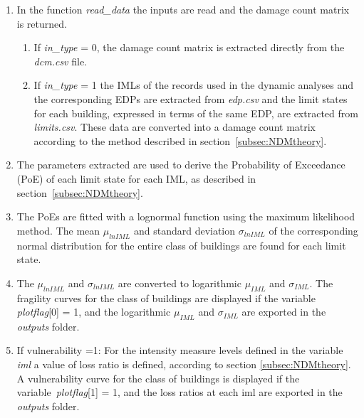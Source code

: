 \begin{enumerate}
\item In the function \textit{read\_data} the inputs are read and the damage count matrix is returned.
\begin{enumerate}
\item If \textit{in\_type} = 0, the damage count matrix is extracted directly from the \textit{dcm.csv} file.

\item If \textit{in\_type} = 1 the IMLs of the records used in the dynamic analyses and the corresponding EDPs are extracted from \textit{edp.csv} and the limit states for each building, expressed in terms of the same EDP, are extracted from \textit{limits.csv}.	 These data are converted into a damage count matrix according to the method described in section~\ref{subsec:NDMtheory}.
\end{enumerate}

\item The parameters extracted are used to derive the Probability of Exceedance (PoE) of each limit state for each IML, as described in section~\ref{subsec:NDMtheory}.

\item The PoEs are fitted with a lognormal function using the maximum likelihood method. The mean $\mu_{ln IML}$ and standard deviation $\sigma_{ln IML}$ of the corresponding normal distribution for the entire class of buildings are found for each limit state.

\item The $\mu_{ln IML}$ and $\sigma_{ln IML}$ are converted to logarithmic $\mu_{IML}$ and $\sigma_{IML}$. The fragility curves for the class of buildings are displayed if the variable \textit{plotflag}[0] = 1, and the logarithmic $\mu_{IML}$ and $\sigma_{IML}$ are exported in the \textit{outputs} folder.

\item If vulnerability =1:  For the intensity measure levels defined in the variable \textit{iml} a value of loss ratio is defined, according to section \ref{subsec:NDMtheory}. A vulnerability curve for the class of buildings is displayed if the variable~\textit{plotflag}[1] = 1, and the loss ratios at each iml are exported in the \textit{outputs} folder.

\end{enumerate}
